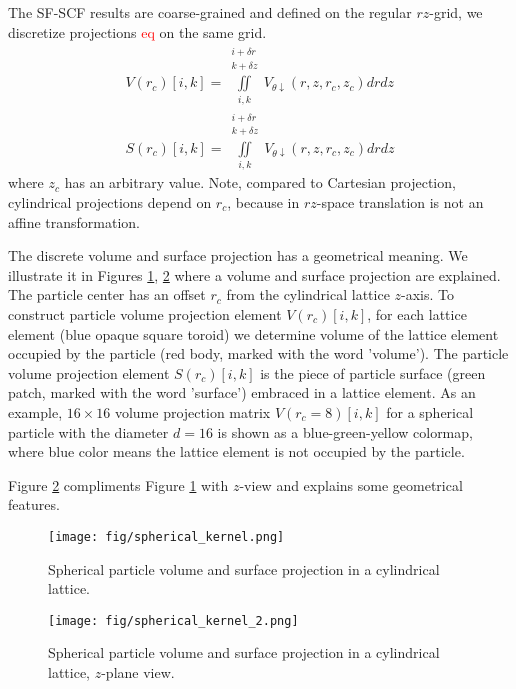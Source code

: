 \documentclass[10pt, a4paper]{article}
\newcommand\todo[1]{\textcolor{red}{#1}}
\begin{document}
\begin{multicols}{2}
The SF-SCF results are coarse-grained and defined on the regular $rz$-grid, we discretize projections \todo{eq} on the same grid.
\begin{eqnarray}
    V(r_c)[i, k] = \iint \limits_{i, k}^{\substack{i+\delta r\\ k+\delta z}} V_{\theta \downarrow} (r, z, r_c, z_c) dr dz
    \\
    S(r_c)[i, k] = \iint \limits_{i, k}^{\substack{i+\delta r\\ k+\delta z}} V_{\theta \downarrow} (r, z, r_c, z_c) dr dz
\end{eqnarray}
where $z_c$ has an arbitrary value.
Note, compared to Cartesian projection, cylindrical projections depend on $r_c$, because in $rz$-space translation is not an affine transformation.

The discrete volume and surface projection has a geometrical meaning.
We illustrate it in Figures \ref{fig:spherical_kernel}, \ref{fig:spherical_kernel_2} where a volume and surface projection are explained.
The particle center has an offset $r_c$ from the cylindrical lattice $z$-axis.
To construct particle volume projection element $V(r_c)[i,k]$, for each lattice element (blue opaque square toroid) we determine volume of the lattice element occupied by the particle (red body, marked with the word 'volume').
The particle volume projection element $S(r_c)[i,k]$ is the piece of particle surface (green patch, marked with the word 'surface') embraced in a lattice element.
As an example, $16 \times 16$ volume projection matrix $V(r_c = 8)[i,k]$ for a spherical particle with the diameter $d=16$ is shown as a blue-green-yellow colormap, where blue color means the lattice element is not occupied by the particle.

Figure \ref{fig:spherical_kernel_2} compliments Figure \ref{fig:spherical_kernel} with $z$-view and explains some geometrical features.

\begin{figure}[H]
        \centering
        \texttt{[image: fig/spherical\_kernel.png]}
        \caption{
            Spherical particle volume and surface projection in a cylindrical lattice.
        }
        \label{fig:spherical_kernel}
    \end{figure}

\begin{figure}[H]
    \centering
    \texttt{[image: fig/spherical\_kernel\_2.png]}
    \caption{
        Spherical particle volume and surface projection in a cylindrical lattice, $z$-plane view.
    }
    \label{fig:spherical_kernel_2}
\end{figure}
    
\end{multicols}
\end{document}
